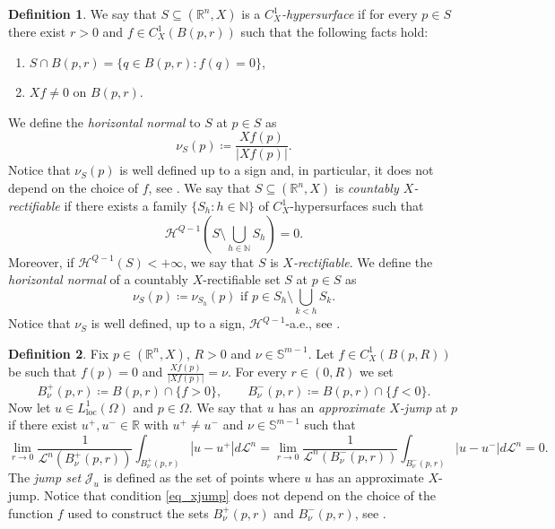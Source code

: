 \documentclass[12pt,a4paper]{amsart}
\theoremstyle{definition}
\newtheorem{defi}{Definition}[section]
\theoremstyle{plain}
\newcommand{\N}{\mathbb{N}}
\newcommand{\R}{\mathbb{R}}
\newcommand{\se}{\subseteq}
\newcommand{\ceq}{\coloneqq}
\newcommand{\leb}{\mathcal{L}}
\newcommand{\J}{\mathcal{J}}
\newcommand{\hau}{\mathcal{H}}
\newcommand{\loc}{\operatorname{loc}}
\begin{document}
\begin{defi}\label{def_ipersup}
We say that $S \se (\R^n,X)$ is a \emph{$C^1_X$-hypersurface} if for every $p \in S$ there exist $r>0$ and $f \in C^1_X(B(p,r))$ such that the following facts hold:
\begin{enumerate}
\item[(i)]$ S \cap B(p,r)=\lbrace q \in B(p,r):f(q)=0 \rbrace$,
\item[(ii)]$Xf\neq 0$ on $B(p,r)$.
\end{enumerate}
We define the \emph{horizontal normal} to $S$ at $p \in S$ as
\[
\nu_S(p) \ceq \frac{Xf(p)}{|Xf(p)|}.
\]
Notice that $\nu_S(p)$ is well defined up to a sign and, in particular, it does not depend on the choice of $f$, see \cite[Corollary 2.14]{dv}. We say that $S  \se (\R^n,X)$ is \emph{countably $X$-rectifiable} if there exists a family $\lbrace S_h: h \in \N \rbrace$ of $C^1_X$-hypersurfaces such that
\[
\hau^{Q-1}\left( S \setminus \bigcup_{h \in \N}S_h \right)=0.
\]
  Moreover, if $\hau^{Q-1}(S)<+\infty$, we say that $S$ is \emph{$X$-rectifiable}. We define the \emph{horizontal normal} of a countably $X$-rectifiable set $S$ at $p \in S$ as 
\[
\nu_S(p) \ceq \nu_{S_h}(p) \text{ if }p \in S_h \setminus \bigcup_{k<h}S_k.
\]
Notice that $\nu_S$ is well defined, up to a sign, $\hau^{Q-1}$-a.e., see \cite[Proposition 2.18]{dv}.
\end{defi}






\begin{defi}\label{def_approxjump}
Fix $p \in (\R^n,X)$, $R>0$ and $\nu \in \mathbb{S}^{m-1}$. Let $f \in C^1_X(B(p,R))$ be such that $f(p)=0$ and $\frac{Xf(p)}{|Xf(p)|}=\nu$. For every $r \in (0,R)$ we set
\[
B^+_\nu(p,r) \ceq B(p,r) \cap \lbrace f>0\rbrace,\qquad
B^-_\nu(p,r) \ceq B(p,r) \cap \lbrace f<0\rbrace.
\]
Now let $u \in L^1_{\loc}(\Omega)$ and $p \in \Omega$. We say that $u$ has an \emph{approximate $X$-jump} at $p$ if there exist $u^+,u^- \in \R$ with $u^+ \neq u^-$ and $\nu \in \mathbb{S}^{m-1}$ such that
\begin{equation}\label{eq_xjump}
\lim_{r \to 0}\frac{1}{\leb^n(B^+_\nu(p,r))}  \int_{B^+_\nu(p,r)} |u-u^+|d\leb^n=\lim_{r \to 0} \frac{1}{\leb^n(B^-_\nu(p,r))}\int_{B^-_\nu(p,r)} |u-u^-|d\leb^n=0.
\end{equation}
The \emph{jump set} $\J_u$ is defined as the set of points where $u$ has an approximate $X$-jump. Notice that condition \eqref{eq_xjump} does not depend on the choice of the function $f$ used to construct the sets  ${B^+_\nu(p,r)}$ and ${B^-_\nu(p,r)}$, see \cite[Proposition 2.26 and Remark 2.27]{dv}.
\end{defi}
\end{document}
